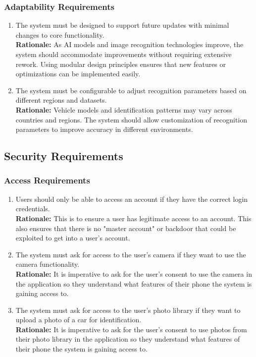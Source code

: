\documentclass[]{article}
\begin{document}
\subsubsection{Adaptability Requirements}
\label{ssub:adaptability_requirements}
\begin{enumerate}[label={MS-A\arabic*.}]
    \item The system must be designed to support future updates with minimal changes to core functionality.\\
   \textbf{Rationale:} As AI models and image recognition technologies improve, the system should accommodate improvements without requiring extensive rework. Using modular design principles ensures that new features or optimizations can be implemented easily. 
   \item The system must be configurable to adjust recognition parameters based on different regions and datasets.\\
   \textbf{Rationale:} Vehicle models and identification patterns may vary across countries and regions. The system should allow customization of recognition parameters to improve accuracy in different environments.
 
\end{enumerate}


\subsection{Security Requirements}
\label{sub:security_requirements}

\subsubsection{Access Requirements}
\label{ssub:access_requirements}
\begin{enumerate}[label={SR-AC\arabic*.}]
    \item Users should only be able to access an account if they have the correct login credentials.\\
    \textbf{Rationale:} This is to ensure a user has legitimate access to an account. This also ensures that there is no "master account" or backdoor that could be exploited to get into a user's account.
    \item The system must ask for access to the user's camera if they want to use the camera functionality.\\
    \textbf{Rationale:} It is imperative to ask for the user's consent to use the camera in the application so they understand what features of their phone the system is gaining access to.
    \item The system must ask for access to the user's photo library if they want to upload a photo of a car for identification.\\
    \textbf{Rationale:} It is imperative to ask for the user's consent to use photos from their photo library in the application so they understand what features of their phone the system is gaining access to.
\end{enumerate}
\end{document}
